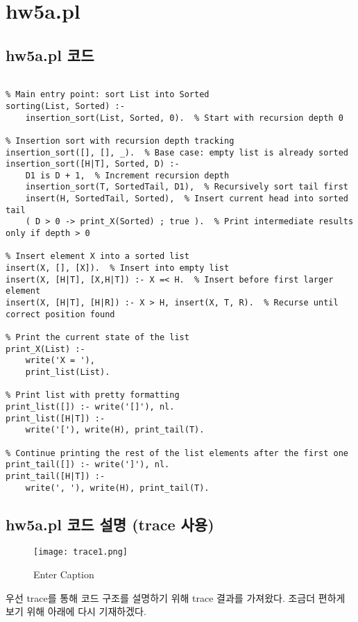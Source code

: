 \documentclass{article}
\begin{document}
\newpage
\section{hw5a.pl}
\subsection{hw5a.pl 코드}
\begin{lstlisting}

% Main entry point: sort List into Sorted
sorting(List, Sorted) :-
    insertion_sort(List, Sorted, 0).  % Start with recursion depth 0

% Insertion sort with recursion depth tracking
insertion_sort([], [], _).  % Base case: empty list is already sorted
insertion_sort([H|T], Sorted, D) :-
    D1 is D + 1,  % Increment recursion depth
    insertion_sort(T, SortedTail, D1),  % Recursively sort tail first
    insert(H, SortedTail, Sorted),  % Insert current head into sorted tail
    ( D > 0 -> print_X(Sorted) ; true ).  % Print intermediate results only if depth > 0

% Insert element X into a sorted list
insert(X, [], [X]).  % Insert into empty list
insert(X, [H|T], [X,H|T]) :- X =< H.  % Insert before first larger element
insert(X, [H|T], [H|R]) :- X > H, insert(X, T, R).  % Recurse until correct position found

% Print the current state of the list
print_X(List) :-
    write('X = '),
    print_list(List).

% Print list with pretty formatting
print_list([]) :- write('[]'), nl.
print_list([H|T]) :-
    write('['), write(H), print_tail(T).

% Continue printing the rest of the list elements after the first one
print_tail([]) :- write(']'), nl.
print_tail([H|T]) :-
    write(', '), write(H), print_tail(T).

\end{lstlisting}


\subsection{hw5a.pl 코드 설명 (trace 사용)}
\begin{figure} [H]
    \centering
    \texttt{[image: trace1.png]}
    \caption{Enter Caption}
    \label{fig:enter-label}
\end{figure}

우선 trace를 통해 코드 구조를 설명하기 위해 trace 결과를 가져왔다.
조금더 편하게 보기 위해 아래에 다시 기재하겠다.
\end{document}
